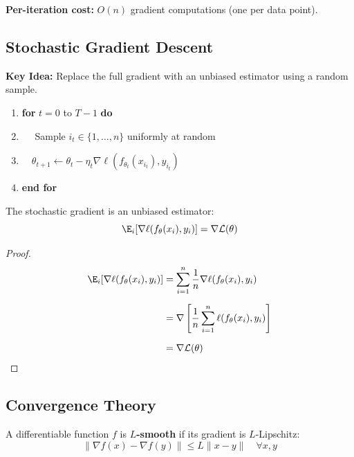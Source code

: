 \documentclass[main.tex]{subfiles}
\begin{document}
\textbf{Per-iteration cost:} $O(n)$ gradient computations (one per data point).

\subsection{Stochastic Gradient Descent}

\textbf{Key Idea:} Replace the full gradient with an unbiased estimator using a random sample.

\begin{algorithm}[SGD]
\begin{enumerate}
    \item \textbf{for} $t = 0$ to $T-1$ \textbf{do}
    \item $\quad$ Sample $i_t \in \{1, \ldots, n\}$ uniformly at random
    \item $\quad \theta_{t+1} \leftarrow \theta_t - \eta_t \nabla \ell(f_{\theta_t}(x_{i_t}), y_{i_t})$
    \item \textbf{end for}
\end{enumerate}
\end{algorithm}

\begin{proposition}
The stochastic gradient is an unbiased estimator:
$$\E_{i}[\nabla \ell(f_\theta(x_i), y_i)] = \nabla \mathcal{L}(\theta)$$
\end{proposition}

\begin{proof}
\begin{align}
\E_{i}[\nabla \ell(f_\theta(x_i), y_i)] &= \sum_{i=1}^{n} \frac{1}{n} \nabla \ell(f_\theta(x_i), y_i) \\[6pt]
&= \nabla \left[\frac{1}{n} \sum_{i=1}^{n} \ell(f_\theta(x_i), y_i)\right] \\[6pt]
&= \nabla \mathcal{L}(\theta)
\end{align}
\end{proof}

\subsection{Convergence Theory}

\begin{definition}[$L$-Smoothness]
A differentiable function $f$ is \textbf{$L$-smooth} if its gradient is $L$-Lipschitz:
$$\|\nabla f(x) - \nabla f(y)\| \leq L\|x - y\| \quad \forall x, y$$
\end{definition}
\end{document}
